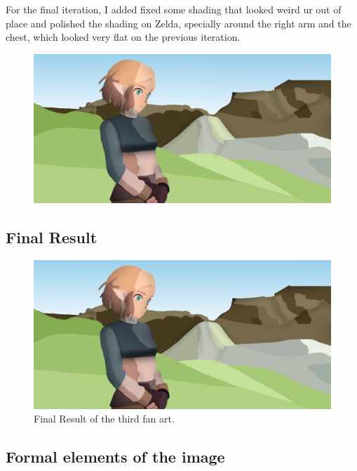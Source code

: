 \documentclass{cup-pan}
\begin{document}
        For the final iteration, I added fixed some shading that looked weird ur out of place and polished the shading on Zelda, specially around the right arm and the chest, which looked very flat on the previous iteration. 
        \begin{figure}[H]
            \includegraphics[width=\textwidth]{Fanart3/3_Color/IIIII_Color.png}
        \end{figure}

    \subsection{Final Result}

        \begin{figure}[H]
            \includegraphics[width=\textwidth]{Fanart3/3_Color/IIIII_Color.png}
             \caption{Final Result of the third fan art.}
         \end{figure}

    \subsection{Formal elements of the image}
\end{document}
